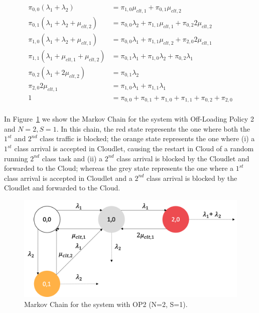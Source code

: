 \begin{equation}
	\begin{split}
		\pi_{0,0}(\lambda_{1}+\lambda_{2})& = \pi_{1,0}\mu_{clt,1}+\pi_{0,1}\mu_{clt,2} \\
		\pi_{0,1}(\lambda_{1}+\lambda_{2}+\mu_{clt,2}) & = \pi_{0,0}\lambda_{2}+\pi_{1,1}\mu_{clt,1}+\pi_{0,2}2\mu_{clt,2} \\
		\pi_{1,0}(\lambda_{1}+\lambda_{2}+\mu_{clt,1}) & = \pi_{0,0}\lambda_{1}+\pi_{1,1}\mu_{clt,2}+\pi_{2,0}2\mu_{clt,1} \\
		\pi_{1,1}(\lambda_{1}+\mu_{clt,1}+\mu_{clt,2}) & = \pi_{0,1}\lambda_{1}+\pi_{1,0}\lambda_{2}+\pi_{0,2}\lambda_{1} \\
		\pi_{0,2}(\lambda_{1}+2\mu_{clt,2}) & = \pi_{0,1}\lambda_{2} \\
		\pi_{2,0}2\mu_{clt,1} & = \pi_{1,0}\lambda_{1}+\pi_{1,1}\lambda_{1} \\
		1 & = \pi_{0,0}+\pi_{0,1}+\pi_{1,0}+\pi_{1,1}+\pi_{0,2}+\pi_{2,0}\\
	\end{split}
	\label{eqn:analytical-model-markov-2}
\end{equation}

In Figure~\ref{fig:analytical-model-markov-2-1} we show the Markov Chain for the system with Off-Loading Policy 2 and $N=2,S=1$. 
In this chain, the red state represents the one where both the $1^{st}$ and $2^{nd}$ class traffic is blocked; the orange state represents the one where (i) a $1^{st}$ class arrival is accepted in Cloudlet, causing the restart in Cloud of a random running $2^{nd}$ class task and (ii) a $2^{nd}$ class arrival is blocked by the Cloudlet and forwarded to the Cloud; whereas the grey state represents the one where a $1^{st}$ class arrival is accepted in Cloudlet and a $2^{nd}$ class arrival is blocked by the Cloudlet and forwarded to the Cloud.

\begin{figure}
	\includegraphics[width=\columnwidth]{fig/analytical-model-markov-2-1}
	\caption{Markov Chain for the system with OP2 (N=2, S=1).}
	\label{fig:analytical-model-markov-2-1}
\end{figure}

